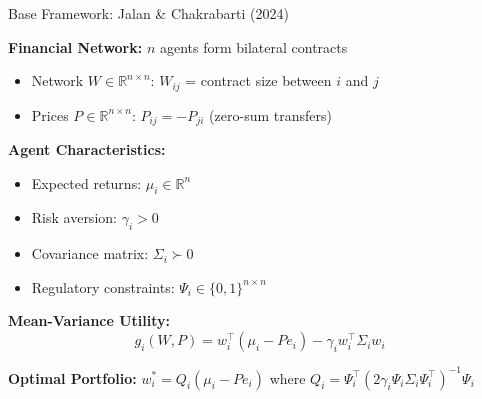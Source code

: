\documentclass[aspectratio=169]{beamer}
\begin{document}
\begin{frame}{Base Framework: Jalan \& Chakrabarti (2024)}
    
    \textbf{Financial Network:} $n$ agents form bilateral contracts
    \begin{itemize}
        \item Network $W \in \mathbb{R}^{n \times n}$: $W_{ij}$ = contract size between $i$ and $j$
        \item Prices $P \in \mathbb{R}^{n \times n}$: $P_{ij} = -P_{ji}$ (zero-sum transfers)
    \end{itemize}
    
    \vspace{0.3cm}
    \textbf{Agent Characteristics:}
    \begin{itemize}
        \item Expected returns: $\mu_i \in \mathbb{R}^n$
        \item Risk aversion: $\gamma_i > 0$
        \item Covariance matrix: $\Sigma_i \succ 0$
        \item Regulatory constraints: $\Psi_i \in \{0,1\}^{n \times n}$
    \end{itemize}
    
    \vspace{0.1cm}
    \textbf{Mean-Variance Utility:}
    \begin{equation*}
    g_i(W,P) = w_i^\top (\mu_i - P e_i) - \gamma_i w_i^\top \Sigma_i w_i
    \end{equation*}
    
    \vspace{0.1cm}
    \textbf{Optimal Portfolio:} $w_i^* = Q_i(\mu_i - Pe_i)$ where $Q_i = \Psi_i^\top(2\gamma_i\Psi_i\Sigma_i\Psi_i^\top)^{-1}\Psi_i$

\end{frame}
\end{document}
